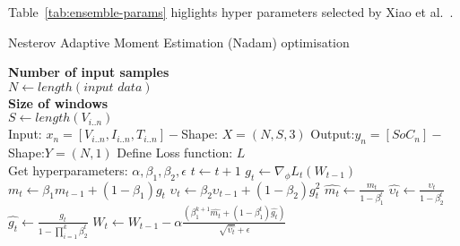%
%
Table~\ref{tab:ensemble-params} higlights hyper parameters selected by Xiao et al.~\cite{xiao_accurate_2019}.
\begin{algorithm}
  \caption{Nesterov Adaptive Moment Estimation (Nadam) optimisation}
  \begin{algorithmic}[1]
    \STATE \textbf{Number of input samples} \\ $N\gets length(\textit{input data})$\\
    \STATE \textbf{Size of windows} \\ $S\gets length(V_{i..n})$\\
    \STATE Input: $x_n = [V_{i..n}, I_{i..n}, T_{i..n}] - $Shape: $X = (N, S, 3)$
    \STATE Output:$y_n = [SoC_{n}] - $Shape:$Y = (N, 1)$
    \STATE Define Loss function: $L$ \\
           Get hyperparameters: $\alpha, \beta_1, \beta_2, \epsilon$
    \STATE $t \gets t+1$
    \STATE $g_t \gets \nabla_\phi L_t (W_{t-1})$ 
    \STATE $m_t \gets \beta_1 m_{t-1}+(1-\beta_1) g_t $ 
    \STATE $\upsilon_t \gets \beta_2 \upsilon_{t-1}+ \left(1-\beta_2 \right)g^2_t $ 
    \STATE $\hat{m_t} \gets \frac{m_t}{1-\beta^t_1}$ 
    \STATE $\hat{\upsilon_t} \gets \frac{\upsilon_t}{1-\beta^t_2} $ 
    \STATE $\hat{g_t} \gets \frac{g_t}{1-\prod\nolimits_{i = 1}^{k}\beta^t_2} $ 
    \STATE $W_t \gets W_{t-1}-\alpha
                        \frac{\left(\beta^{k+1}_1\hat{m_t}+\left(1-\beta^t_1\right)\hat{g_t}\right)}
                             {\sqrt{\hat{\upsilon_t}}+\epsilon}$
    \ENDWHILE
  \end{algorithmic}
  \label{alg:nadam}
\end{algorithm}
